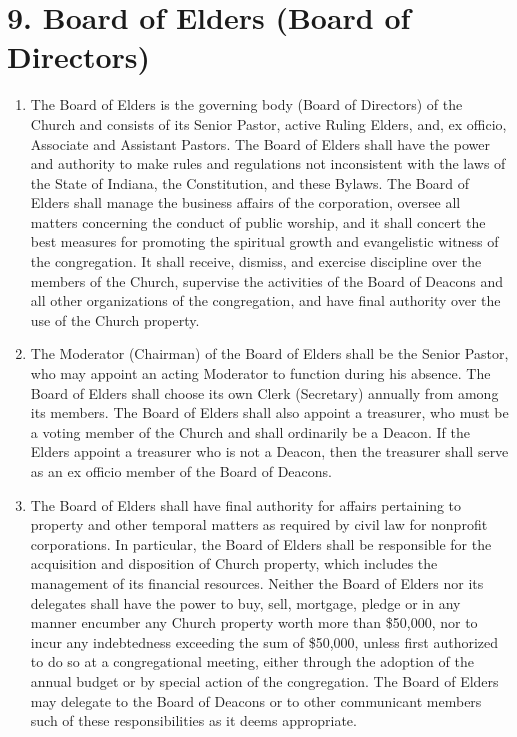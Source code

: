 \documentclass[
]{book}
\begin{document}
\hypertarget{board-of-elders-board-of-directors}{%
\section{9. Board of Elders (Board of Directors)}\label{board-of-elders-board-of-directors}}

\begin{enumerate}
\def\labelenumi{\alph{enumi}.}
\item
  The Board of Elders is the governing body (Board of Directors) of the Church and consists of its Senior Pastor, active Ruling Elders, and, ex officio, Associate and Assistant Pastors. The Board of Elders shall have the power and authority to make rules and regulations not inconsistent with the laws of the State of Indiana, the Constitution, and these Bylaws. The Board of Elders shall manage the business affairs of the corporation, oversee all matters concerning the conduct of public worship, and it shall concert the best measures for promoting the spiritual growth and evangel­istic witness of the congregation. It shall receive, dismiss, and exercise discipline over the members of the Church, supervise the activities of the Board of Deacons and all other organizations of the congregation, and have final authority over the use of the Church property.
\item
  The Moderator (Chairman) of the Board of Elders shall be the Senior Pastor, who may appoint an acting Moderator to function during his absence. The Board of Elders shall choose its own Clerk (Secretary) annually from among its members. The Board of Elders shall also appoint a treasurer, who must be a voting member of the Church and shall ordinarily be a Deacon. If the Elders appoint a treasurer who is not a Deacon, then the treasurer shall serve as an ex officio member of the Board of Deacons.
\item
  The Board of Elders shall have final authority for affairs pertaining to property and other temporal matters as required by civil law for nonprofit corporations. In particular, the Board of Elders shall be responsible for the acquisition and disposition of Church property, which includes the management of its financial resources. Neither the Board of Elders nor its delegates shall have the power to buy, sell, mortgage, pledge or in any manner encumber any Church property worth more than \$50,000, nor to incur any indebted­ness exceeding the sum of \$50,000, unless first authorized to do so at a congregational meeting, either through the adoption of the annual budget or by special action of the congregation. The Board of Elders may delegate to the Board of Deacons or to other communicant members such of these responsibilities as it deems approp­riate.

\end{enumerate}
\end{document}
